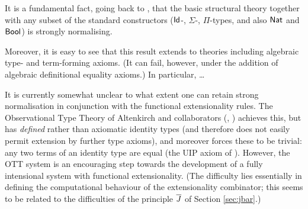 \documentclass{amsart}
\begin{document}
\begin{para}  It is a fundamental fact, going back to \cite{martin-lof:predicative-part}, that the basic structural theory together with any subset of the standard constructors ($\mathsf{Id}$-, $\Sigma$-, $\Pi$-types, and also $\mathsf{Nat}$ and $\mathsf{Bool}$) is strongly normalising.

Moreover, it is easy to see  that this result extends to theories including algebraic type- and term-forming axioms.  (It can fail, however, under the addition of algebraic definitional equality axioms.)  In particular, \ldots


It is currently somewhat unclear to what extent one can retain strong normalisation in conjunction with the functional extensionality rules.  The Observational Type Theory of Altenkirch and collaborators (\cite{altenkirch:ott}, \cite{altenkirch-mcbride-swierstra}) achieves this, but has \emph{defined} rather than axiomatic identity types (and therefore does not easily permit extension by further type axioms), and moreover forces these to be trivial: any two terms of an identity type are equal (the UIP axiom of \cite{hofmann:extensional??}).  However, the OTT system is an encouraging step towards the development of a fully intensional system with functional extensionality.  (The difficulty lies essentially in defining the computational behaviour of the extensionality combinator; this seems to be related to the difficulties of the principle $\overline{J}$ of Section \ref{sec:jbar}.)
\end{para}
\end{document}
